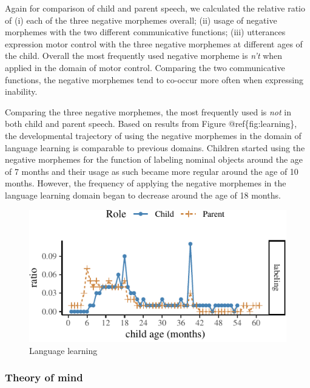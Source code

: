 \documentclass[10pt, letterpaper]{article}
\newenvironment{CodeChunk}{}{}
\begin{document}
Again for comparison of child and parent speech, we calculated the
relative ratio of (i) each of the three negative morphemes overall; (ii)
usage of negative morphemes with the two different communicative
functions; (iii) utterances expression motor control with the three
negative morphemes at different ages of the child. Overall the most
frequently used negative morpheme is \emph{n't} when applied in the
domain of motor control. Comparing the two communicative functions, the
negative morphemes tend to co-occur more often when expressing
inability.

Comparing the three negative morphemes, the most frequently used is
\emph{not} in both child and parent speech. Based on results from Figure
@ref\{fig:learning\}, the developmental trajectory of using the negative
morphemes in the domain of language learning is comparable to previous
domains. Children started using the negative morphemes for the function
of labeling nominal objects around the age of 7 months and their usage
as such became more regular around the age of 10 months. However, the
frequency of applying the negative morphemes in the language learning
domain began to decrease around the age of 18 months.

\begin{CodeChunk}
\begin{figure}[H]

{\centering \includegraphics{figs/learning-1} 

}

\caption[Language learning]{Language learning}\label{fig:learning}
\end{figure}
\end{CodeChunk}

\hypertarget{theory-of-mind}{%
\subsubsection{Theory of mind}\label{theory-of-mind}}
\end{document}
